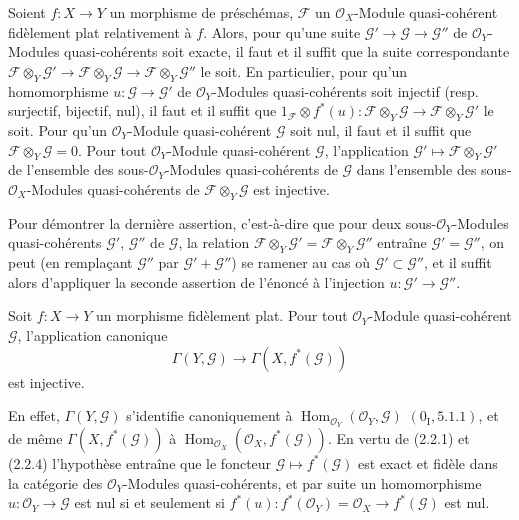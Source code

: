 \begin{proposition}[2.2.7]
\label{IV.2.2.7-fr}
Soient $f:X\to Y$ un morphisme de préschémas, $\mathscr F$ un
$\mathcal O_X$-Module quasi-cohérent fidèlement plat relativement à $f$.
Alors, pour qu'une suite $\mathscr G'\to\mathscr G\to\mathscr G''$ de
$\mathcal O_Y$-Modules quasi-cohérents soit exacte, il faut et il suffit que
la suite correspondante
$\mathscr F\otimes_Y\mathscr G'\to\mathscr F\otimes_Y\mathscr G
\to\mathscr F\otimes_Y\mathscr G''$ le soit. En particulier, pour qu'un
homomorphisme $u:\mathscr G\to\mathscr G'$ de $\mathcal O_Y$-Modules
quasi-cohérents soit injectif (resp. surjectif, bijectif, nul), il faut et il
suffit que $1_{\mathscr F}\otimes f^*(u):
\mathscr F\otimes_Y\mathscr G\to\mathscr F\otimes_Y\mathscr G'$ le soit.
Pour qu'un $\mathcal O_Y$-Module quasi-cohérent $\mathscr G$ soit nul, il faut
et il suffit que $\mathscr F\otimes_Y\mathscr G=0$. Pour tout
$\mathcal O_Y$-Module quasi-cohérent $\mathscr G$, l'application
$\mathscr G'\mapsto\mathscr F\otimes_Y\mathscr G'$ de l'ensemble des
sous-$\mathcal O_Y$-Modules quasi-cohérents de $\mathscr G$ dans l'ensemble
des sous-$\mathcal O_X$-Modules quasi-cohérents de
$\mathscr F\otimes_Y\mathscr G$ est injective.
\end{proposition}

Pour démontrer la dernière assertion, c'est-à-dire que pour deux
sous-$\mathcal O_Y$-Modules quasi-cohérents $\mathscr G'$, $\mathscr G''$ de
$\mathscr G$, la relation
$\mathscr F\otimes_Y\mathscr G'=\mathscr F\otimes_Y\mathscr G''$ entraîne
$\mathscr G'=\mathscr G''$, on peut (en remplaçant $\mathscr G''$ par
$\mathscr G'+\mathscr G''$) se ramener au cas où
$\mathscr G'\subset\mathscr G''$, et il suffit alors d'appliquer la seconde
assertion de l'énoncé à l'injection $u:\mathscr G'\to\mathscr G''$.

\begin{corollary}[2.2.8]
\label{IV.2.2.8-fr}
Soit $f:X\to Y$ un morphisme fidèlement plat. Pour tout
$\mathcal O_Y$-Module quasi-cohérent $\mathscr G$, l'application canonique
\begin{equation}
\tag{2.2.8.1}
\label{IV.2.2.8.1-fr}
\Gamma(Y,\mathscr G)\longrightarrow\Gamma(X,f^*(\mathscr G))
\end{equation}
est injective.
\end{corollary}

En effet, $\Gamma(Y,\mathscr G)$ s'identifie canoniquement à
$\operatorname{Hom}_{\mathcal O_Y}(\mathcal O_Y,\mathscr G)$
$(0_{\mathrm I},5.1.1)$, et de même $\Gamma(X,f^*(\mathscr G))$ à
$\operatorname{Hom}_{\mathcal O_X}(\mathcal O_X,f^*(\mathscr G))$. En vertu
de (2.2.1) et (2.2.4) l'hypothèse entraîne que le foncteur
$\mathscr G\mapsto f^*(\mathscr G)$ est exact et fidèle dans la catégorie des
$\mathcal O_Y$-Modules quasi-cohérents, et par suite un homomorphisme
$u:\mathcal O_Y\to\mathscr G$ est nul si et seulement si
$f^*(u):f^*(\mathcal O_Y)=\mathcal O_X\to f^*(\mathscr G)$ est nul.

